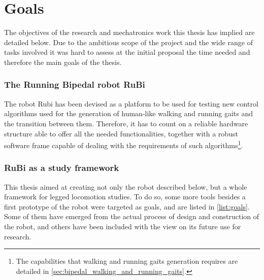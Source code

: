 \section{Goals}
\label{sec:goals}
The objectives of the research and mechatronics work this thesis has implied are detailed below.
Due to the ambitious scope of the project and the wide range of tasks involved it was hard to assess at the initial proposal the time needed and therefore the main goals of the thesis. 

\subsubsection{The Running Bipedal robot RuBi} %
\label{ssub:the_running_bipedal_robot_rubi}
The robot Rubi has been devised as a platform to be used for testing new control algorithms used for the generation of human-like walking and running gaits and the transition between them.
Therefore, it has to count on a reliable hardware structure able to offer all the needed functionalities, together with a robust software frame capable of dealing with the requirements of such algorithms\footnote{The capabilities that walking and running gaits generation requires are detailed in \ref{sec:bipedal_walking_and_running_gaits}.}.


\subsubsection{RuBi as a study framework} %
\label{ssub:rubi_as_a_study_framework}
This thesis aimed at creating not only the robot described below, but a whole framework for legged locomotion studies.
To do so, some more tools besides a first prototype of the robot were targeted as goals, and are listed in \ref{list:goals}.
Some of them have emerged from the actual process of design and construction of the robot, and others have been included with the view on its future use for research.

